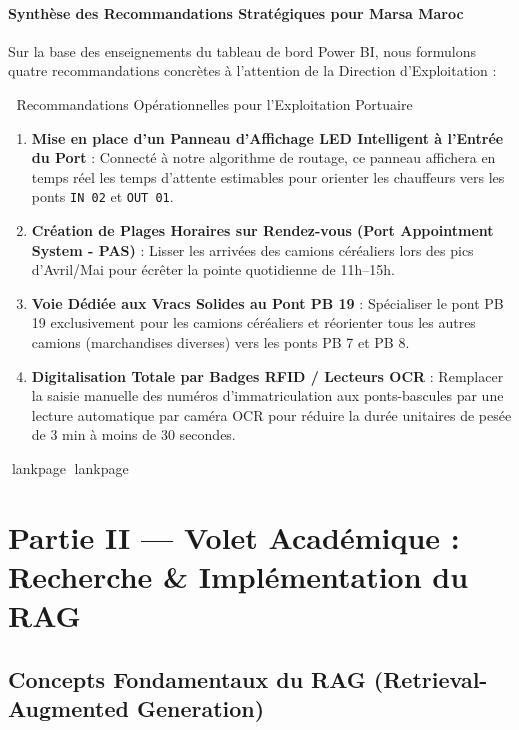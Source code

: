 \documentclass[12pt,a4paper,oneside]{report}
\newcommand{\blankpage}{%
  \newpage
  \thispagestyle{empty}%
  \mbox{}%
  \newpage
}
\begin{document}
\subsubsection{Synthèse des Recommandations Stratégiques pour Marsa Maroc}
Sur la base des enseignements du tableau de bord Power BI, nous formulons quatre recommandations concrètes à l'attention de la Direction d'Exploitation :

\begin{marsabox}{🚀 Recommandations Opérationnelles pour l'Exploitation Portuaire}
\begin{enumerate}
    \item \textbf{Mise en place d'un Panneau d'Affichage LED Intelligent à l'Entrée du Port} : Connecté à notre algorithme de routage, ce panneau affichera en temps réel les temps d'attente estimables pour orienter les chauffeurs vers les ponts \texttt{IN 02} et \texttt{OUT 01}.
    \item \textbf{Création de Plages Horaires sur Rendez-vous (Port Appointment System - PAS)} : Lisser les arrivées des camions céréaliers lors des pics d'Avril/Mai pour écrêter la pointe quotidienne de 11h–15h.
    \item \textbf{Voie Dédiée aux Vracs Solides au Pont PB 19} : Spécialiser le pont PB 19 exclusivement pour les camions céréaliers et réorienter tous les autres camions (marchandises diverses) vers les ponts PB 7 et PB 8.
    \item \textbf{Digitalisation Totale par Badges RFID / Lecteurs OCR} : Remplacer la saisie manuelle des numéros d'immatriculation aux ponts-bascules par une lecture automatique par caméra OCR pour réduire la durée unitaires de pesée de 3 min à moins de 30 secondes.
\end{enumerate}
\end{marsabox}

lankpage
lankpage
\blankpage

\chapter{Partie II — Volet Académique : Recherche \& Implémentation du RAG}

\section{Concepts Fondamentaux du RAG (Retrieval-Augmented Generation)}
\end{document}
